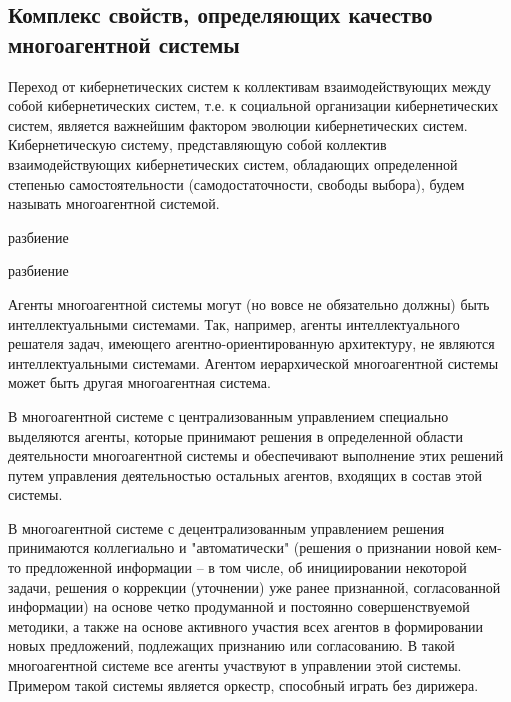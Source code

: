 \subsection{Комплекс свойств, определяющих качество многоагентной системы}
{\label{sec_mas_overall_quality}} 

Переход от кибернетических систем к коллективам взаимодействующих между собой кибернетических систем, т.е. к социальной организации кибернетических систем, является важнейшим фактором эволюции кибернетических систем. 
Кибернетическую систему, представляющую собой коллектив взаимодействующих кибернетических систем, обладающих определенной степенью самостоятельности (самодостаточности, свободы выбора), будем называть многоагентной системой.

\begin{SCn}
\begin{scnrelfromset}{разбиение}
    \begin{scnindent}
    \begin{scnrelfromset}{разбиение}
    \end{scnrelfromset}
    \end{scnindent}
\end{scnrelfromset}
\end{SCn}

Агенты многоагентной системы могут (но вовсе не обязательно должны) быть интеллектуальными системами. 
Так, например, агенты интеллектуального решателя задач, имеющего агентно-ориентированную архитектуру, не являются интеллектуальными системами. 
Агентом иерархической многоагентной системы может быть другая многоагентная система.

В многоагентной системе с централизованным управлением специально выделяются агенты, которые принимают решения в определенной области деятельности многоагентной системы и обеспечивают выполнение этих решений путем управления деятельностью остальных агентов, входящих в состав этой системы.

В многоагентной системе с децентрализованным управлением решения принимаются коллегиально и "автоматически"{} (решения о признании новой кем-то предложенной информации – в том числе, об инициировании некоторой задачи, решения о коррекции (уточнении) уже ранее признанной, согласованной информации) на основе четко продуманной и постоянно совершенствуемой методики, а также на основе активного участия всех агентов в формировании новых предложений, подлежащих признанию или согласованию. 
В такой многоагентной системе все агенты участвуют в управлении этой системы. 
Примером такой системы является оркестр, способный играть без дирижера.


